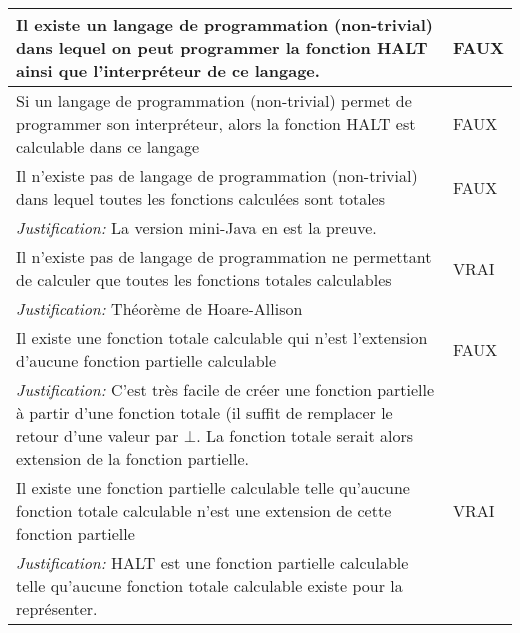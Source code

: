 \begin{longtable}{p{13cm}|l}
    \hline
    Il existe un langage de programmation (non-trivial) dans lequel on peut programmer la fonction HALT ainsi que l'interpréteur de ce langage. & FAUX \\
    \hline
    Si un langage de programmation (non-trivial) permet de programmer son interpréteur, alors la fonction HALT est calculable dans ce langage & FAUX \\
    \hline
    Il n'existe pas de langage de programmation (non-trivial) dans lequel toutes les fonctions calculées sont totales & FAUX  \\
    \textit{Justification:} La version mini-Java en est la preuve. & \\
    \hline
    Il n'existe pas de langage de programmation ne permettant de calculer que toutes les fonctions totales calculables & VRAI\\
    \textit{Justification:} Théorème de Hoare-Allison & \\
    \hline
    Il existe une fonction totale calculable qui n'est l'extension d'aucune fonction partielle calculable & FAUX \\
    \textit{Justification:} C'est très facile de créer une fonction partielle à partir d'une fonction totale (il suffit de remplacer le retour d'une valeur par $\bot$. La fonction totale serait alors extension de la fonction partielle. & \\
    \hline
    Il existe une fonction partielle calculable telle qu'aucune fonction totale calculable n'est une extension de cette fonction partielle & VRAI \\
    \textit{Justification:} HALT est une fonction partielle calculable telle qu'aucune fonction totale calculable existe pour la représenter. & \\

\end{longtable}